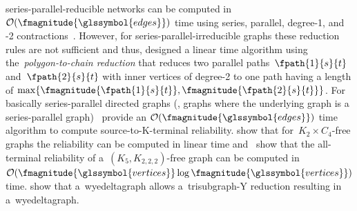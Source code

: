 series-parallel-reducible networks can be computed
in~$\bigO(\fmagnitude{\glssymbol{edges}})$ time using series, parallel,
degree-1, and -2 contractions~\parencite[pp.827ff.]{Sat85}. However, for
series-parallel-irreducible graphs these reduction rules are not sufficient and
thus, \textcite{Sat85} designed a linear time algorithm using
the~\emph{polygon-to-chain reduction} that reduces two parallel
paths~$\fpath{1}{\source}{\sink}$ and~$\fpath{2}{\source}{\sink}$ with inner
vertices of degree-2 to one path having a length of $\max\{
\fmagnitude{\fpath{1}{\source}{\sink}},
\fmagnitude{\fpath{2}{\source}{\sink}} \}$. For basically series-parallel
directed graphs (\ie, graphs where the underlying graph is a series-parallel
graph)~\textcite{Agr84,Agr85} provide an $\bigO(\fmagnitude{\glssymbol{edges}})$
time algorithm to compute source-to-K-terminal reliability.
\textcite{Pol86,Pol90} show that for~$K_2\times C_4$-free graphs the reliability
can be computed in linear time and~\textcite{Pol92} show that the all-terminal
reliability of a~$(K_5, K_ {2,2,2})$-free graph can be computed
in~$\bigO(\fmagnitude{\glssymbol{vertices}}\log\fmagnitude{\glssymbol{vertices}})$
time. \textcite[p.13; Proposition~2]{Sat93} show that a~\gls{wyedeltagraph}
allows a~\gls{trisubgraph}-Y reduction resulting in a~\gls{wyedeltagraph}.

